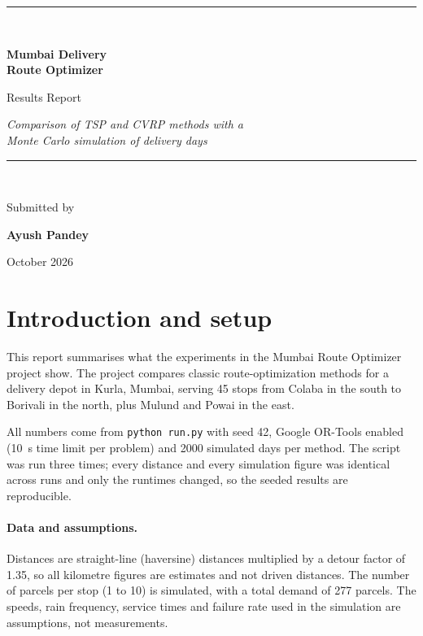 \documentclass[11pt,a4paper]{article}
\begin{document}
\begin{titlepage}
  \thispagestyle{empty}
  \centering
  \vspace*{3.2cm}
  {\color{accent}\rule{\linewidth}{1.2pt}}\\[0.9cm]
  {\Huge\bfseries Mumbai Delivery\\[0.2cm] Route Optimizer\par}
  \vspace{0.6cm}
  {\Large Results Report\par}
  \vspace{0.3cm}
  {\large\itshape Comparison of TSP and CVRP methods with a\\ Monte Carlo simulation of delivery days\par}
  \vspace{0.9cm}
  {\color{accent}\rule{\linewidth}{1.2pt}}\\[3.2cm]
  {\large Submitted by\par}
  \vspace{0.3cm}
  {\Huge\bfseries Ayush Pandey\par}
  \vfill
  {\large October 2026\par}
  \vspace{1.5cm}
\end{titlepage}

\tableofcontents
\newpage

\section{Introduction and setup}

This report summarises what the experiments in the Mumbai Route Optimizer project show. The project
compares classic route-optimization methods for a delivery depot in Kurla, Mumbai, serving 45 stops
from Colaba in the south to Borivali in the north, plus Mulund and Powai in the east.

All numbers come from \texttt{python run.py} with seed 42, Google OR-Tools enabled (10~s time limit per
problem) and 2000 simulated days per method. The script was run three times; every distance and every
simulation figure was identical across runs and only the runtimes changed, so the seeded results are
reproducible.

\paragraph{Data and assumptions.} Distances are straight-line (haversine) distances multiplied by a detour
factor of 1.35, so all kilometre figures are estimates and not driven distances. The number of parcels per
stop (1 to 10) is simulated, with a total demand of 277 parcels. The speeds, rain frequency, service times
and failure rate used in the simulation are assumptions, not measurements.
\end{document}
